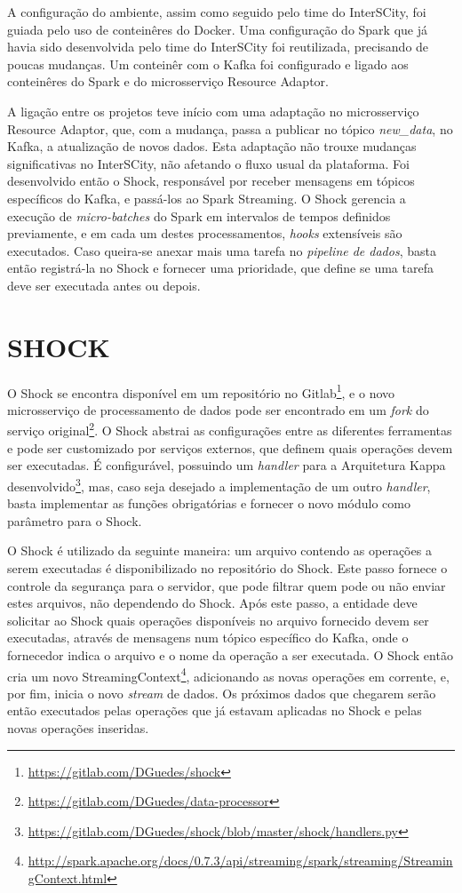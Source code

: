 A configuração do ambiente, assim como seguido pelo time do InterSCity, foi
guiada pelo uso de conteinêres do Docker. Uma configuração do Spark
que já havia sido desenvolvida pelo time do InterSCity foi reutilizada,
precisando de poucas mudanças. Um conteinêr com o Kafka foi configurado e
ligado aos conteinêres do Spark e do microsserviço Resource Adaptor.

A ligação entre os projetos teve início com uma adaptação no microsserviço
Resource Adaptor, que, com a mudança, passa a publicar no tópico
\textit{new\_data}, no Kafka, a atualização de novos dados. Esta
adaptação não trouxe mudanças significativas no InterSCity, não afetando o
fluxo usual da plataforma. Foi desenvolvido então o Shock, responsável por
receber mensagens em tópicos específicos do Kafka, e passá-los ao Spark
Streaming. O Shock gerencia a execução de \textit{micro-batches} do Spark em
intervalos de tempos definidos previamente, e em cada um destes processamentos,
\textit{hooks} extensíveis são executados. Caso queira-se anexar mais uma
tarefa no \textit{pipeline de dados}, basta então registrá-la no Shock e
fornecer uma prioridade, que define se uma tarefa deve ser executada antes ou
depois.

\section{SHOCK}

O Shock se encontra disponível em um repositório no
Gitlab\footnote{\url{https://gitlab.com/DGuedes/shock}}, e o novo microsserviço
de processamento de dados pode ser encontrado em um \textit{fork} do serviço
original\footnote{\url{https://gitlab.com/DGuedes/data-processor}}. O Shock
abstrai as configurações entre as diferentes ferramentas e pode ser customizado
por serviços externos, que definem quais operações devem ser executadas.
É configurável, possuindo um \textit{handler} para a Arquitetura Kappa
desenvolvido\footnote{\url{https://gitlab.com/DGuedes/shock/blob/master/shock/handlers.py}},
mas, caso seja desejado a implementação de um outro \textit{handler}, basta
implementar as funções obrigatórias e fornecer o novo módulo como parâmetro
para o Shock.

O Shock é utilizado da seguinte maneira: um arquivo contendo as operações a
serem executadas é disponibilizado no repositório do Shock. Este passo fornece
o controle da segurança para o servidor, que pode filtrar quem pode ou não
enviar estes arquivos, não dependendo do Shock. Após este passo, a entidade
deve solicitar ao Shock quais operações disponíveis no arquivo fornecido
devem ser executadas, através de mensagens num tópico específico do Kafka, onde
o fornecedor indica o arquivo e o nome da operação a ser executada. O Shock
então cria um novo
StreamingContext\footnote{\url{http://spark.apache.org/docs/0.7.3/api/streaming/spark/streaming/StreamingContext.html}},
adicionando as novas operações em corrente, e, por fim, inicia o novo
\textit{stream} de dados. Os próximos dados que chegarem serão então executados
pelas operações que já estavam aplicadas no Shock e pelas novas operações
inseridas.
